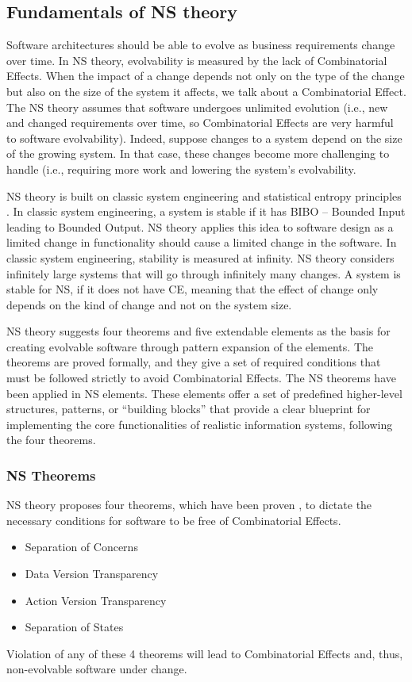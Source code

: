 \subsection{Fundamentals of NS theory}\label{NS Fundamentals} Software architectures
should be able to evolve as business requirements change over time. In NS theory,
evolvability is measured by the lack of Combinatorial Effects. When the impact of a change
depends not only on the type of the change but also on the size of the system it affects,
we talk about a Combinatorial Effect. The NS theory assumes that software undergoes
unlimited evolution (i.e., new and changed requirements over time, so Combinatorial
Effects are very harmful to software evolvability). Indeed, suppose changes to a system
depend on the size of the growing system. In that case, these changes become more
challenging to handle (i.e., requiring more work and lowering the system's evolvability. 

NS theory is built on classic system engineering and statistical entropy principles
\parencite{mannaert_normalized_2016} \parencite{mannaert_towards_2012}. In
classic system engineering, a system is stable if it has BIBO – Bounded Input leading to
Bounded Output. NS theory applies this idea to software design as a limited change in
functionality should cause a limited change in the software. In classic system
engineering, stability is measured at infinity. NS theory considers infinitely large
systems that will go through infinitely many changes. A system is stable for NS, if it
does not have CE, meaning that the effect of change only depends on the kind of change and
not on the system size.

NS theory suggests four theorems and five extendable elements as the basis for creating
evolvable software through pattern expansion of the elements. The theorems are proved
formally, and they give a set of required conditions that must be followed strictly to
avoid Combinatorial Effects. The NS theorems have been applied in NS elements. These
elements offer a set of predefined higher-level structures, patterns, or “building blocks”
that provide a clear blueprint for implementing the core functionalities of realistic
information systems, following the four theorems.
%
%
\subsubsection{NS Theorems}\label{NS Theorems}
NS theory proposes four theorems, which have been proven \parencite{mannaert_normalized_2016} \parencite{mannaert_towards_2012}, to dictate the necessary conditions for software to be free of Combinatorial Effects.
\begin{itemize}
    \item Separation of Concerns 
    \item Data Version Transparency
    \item Action Version Transparency 
    \item Separation of States
\end{itemize}
Violation of any of these 4 theorems will lead to Combinatorial Effects and, thus, non-evolvable software under change.
%
%
